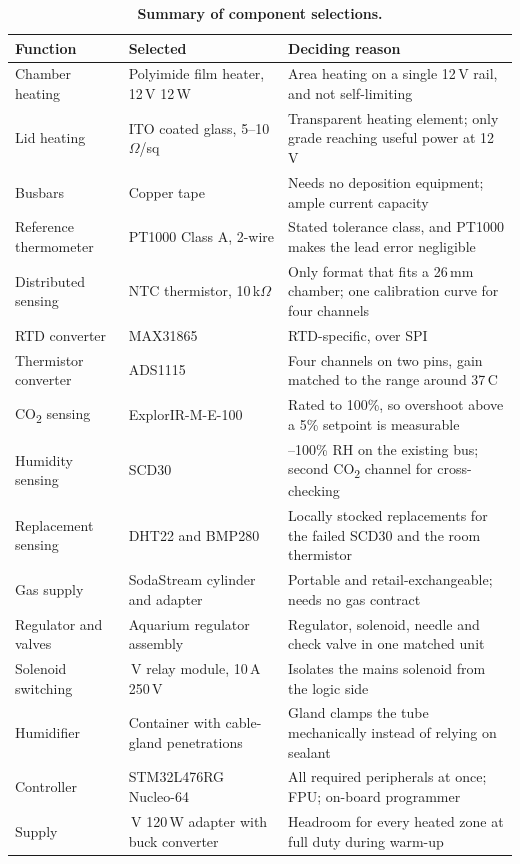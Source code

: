 \begin{table}[H]
    \centering
    \caption[Summary of component selections]{\textbf{Summary of component selections.}}
    \label{tab:selection-summary}
    \small
    \setlength{\tabcolsep}{5pt}
    \renewcommand{\arraystretch}{1.2}
    \begin{tabular}{@{}>{\raggedright\arraybackslash}p{3.3cm}>{\raggedright\arraybackslash}p{4.7cm}>{\raggedright\arraybackslash}p{8.6cm}@{}}
        \toprule
        \textbf{Function} & \textbf{Selected} & \textbf{Deciding reason} \\
        \midrule
        Chamber heating & Polyimide film heater, 12\,V 12\,W & Area heating on a single 12\,V rail, and not self-limiting \\
        Lid heating & ITO coated glass, 5--10\,$\Omega$/sq & Transparent heating element; only grade reaching useful power at 12\,V \\
        Busbars & Copper tape & Needs no deposition equipment; ample current capacity \\
        Reference thermometer & PT1000 Class A, 2-wire & Stated tolerance class, and PT1000 makes the lead error negligible \\
        Distributed sensing & NTC thermistor, 10\,k$\Omega$ & Only format that fits a 26\,mm chamber; one calibration curve for four channels \\
        RTD converter & MAX31865 & RTD-specific, over SPI \citep{maxim_max31865_2015} \\
        Thermistor converter & ADS1115 & Four channels on two pins, gain matched to the range around 37\,\textdegree{}C \\
        CO\textsubscript{2} sensing & ExplorIR-M-E-100 & Rated to 100\%, so overshoot above a 5\% setpoint is measurable \\
        Humidity sensing & SCD30 & 0--100\% RH on the existing bus; second CO\textsubscript{2} channel for cross-checking \\
        Replacement sensing & DHT22 and BMP280 & Locally stocked replacements for the failed SCD30 and the room thermistor \\
        Gas supply & SodaStream cylinder and adapter & Portable and retail-exchangeable; needs no gas contract \\
        Regulator and valves & Aquarium regulator assembly & Regulator, solenoid, needle and check valve in one matched unit \\
        Solenoid switching & 5\,V relay module, 10\,A 250\,V & Isolates the mains solenoid from the logic side \\
        Humidifier & Container with cable-gland penetrations & Gland clamps the tube mechanically instead of relying on sealant \\
        Controller & STM32L476RG Nucleo-64 & All required peripherals at once; FPU; on-board programmer \\
        Supply & 12\,V 120\,W adapter with buck converter & Headroom for every heated zone at full duty during warm-up \\
        \bottomrule
    \end{tabular}
\end{table}



